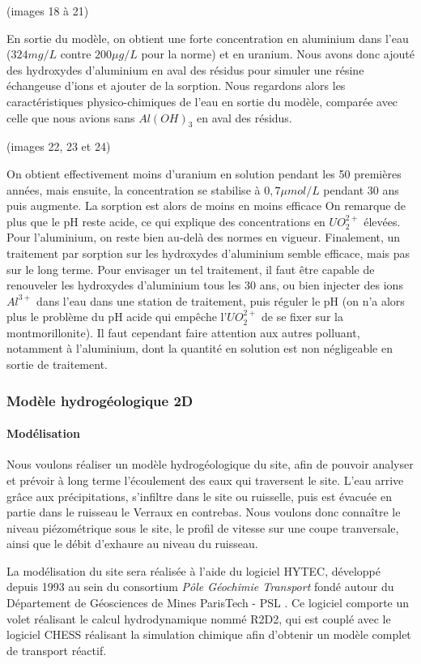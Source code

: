 \documentclass{article}
\begin{document}
(images 18 à 21)

En sortie du modèle, on obtient une forte concentration en aluminium dans l’eau ($324 mg/L$ contre $200 \mu g/L$ pour la norme) et en uranium. Nous avons donc ajouté des hydroxydes d’aluminium en aval des résidus pour simuler une résine échangeuse d’ions et ajouter de la sorption.
Nous regardons alors les caractéristiques physico-chimiques de l’eau en sortie du modèle, comparée avec celle que nous avions sans $Al(OH)_3$ en aval des résidus.

(images 22, 23 et 24)

On obtient effectivement moins d’uranium en solution pendant les 50 premières années, mais ensuite, la concentration se stabilise à $0,7 \mu mol/L$ pendant 30 ans puis augmente. La sorption est alors de moins en moins efficace On remarque de plus que le pH reste acide, ce qui explique des concentrations en $UO_2^{2+}$ élevées. Pour l’aluminium, on reste bien au-delà des normes en vigueur.
Finalement, un traitement par sorption sur les hydroxydes d’aluminium semble efficace, mais pas sur le long terme. Pour envisager un tel traitement, il faut être capable de renouveler les hydroxydes d’aluminium tous les 30 ans, ou bien injecter des ions $Al^{3+}$ dans l’eau dans une station de traitement, puis réguler le pH (on n’a alors plus le problème du pH acide qui empêche l’$UO_2^{2+}$ de se fixer sur la montmorillonite). Il faut cependant faire attention aux autres polluant, notamment à l’aluminium, dont la quantité en solution est non négligeable en sortie de traitement.




\subsubsection{Modèle hydrogéologique 2D}
\paragraph{Modélisation}
Nous voulons réaliser un modèle hydrogéologique du site, afin de pouvoir analyser et prévoir à long terme l'écoulement des eaux qui traversent le site. L'eau arrive grâce aux précipitations, s'infiltre dans le site ou ruisselle, puis est évacuée en partie dans le ruisseau le Verraux en contrebas. Nous voulons donc connaître le niveau piézométrique sous le site, le profil de vitesse sur une coupe tranversale, ainsi que le débit d'exhaure au niveau du ruisseau.

La modélisation du site sera réalisée à l'aide du logiciel HYTEC, développé depuis 1993 au sein du consortium \emph{Pôle Géochimie Transport} fondé autour du Département de Géosciences de Mines ParisTech - PSL \cite{site_hytec_hydrodynamique_nodate}. 
Ce logiciel comporte un volet réalisant le calcul hydrodynamique nommé R2D2, qui est couplé avec le logiciel CHESS réalisant la simulation chimique \cite{lagneau:hal-00614306} afin d'obtenir un modèle complet de transport réactif. 
\end{document}
